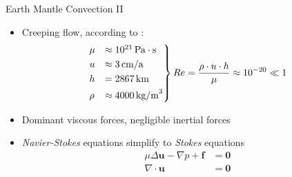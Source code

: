 \documentclass[aspectratio=43,t]{beamer}
\begin{document}
\begin{frame}{Earth Mantle Convection II}
\begin{itemize}
	\item Creeping flow, according to \cite{weismueller.2015}:
		\begin{align*}
		\begin{rcases}
		\mu &\approx10^{21}\,\text{Pa}\cdot \text{s}\\
		u &\approx3\,\text{cm/a}\\
		h &=2 867\,\text{km}\\
		\rho &\approx4000\,\text{kg/m}^3
		\end{rcases}
		Re =\frac{\rho \cdot u \cdot h}{\mu}\approx10^{-20} \ll 1
		\end{align*}
\pause
	\item Dominant viscous forces, negligible inertial forces
	\item \textit{Navier-Stokes} equations simplify to \textit{Stokes} equations
		\begin{align*}
		\mu\Delta \bm{u}-\nabla p + \bm{f} &= \bm{0}\\
		\nabla \cdot \bm{u} &= \bm{0}
		\end{align*}
\end{itemize}

\end{frame}
\end{document}

